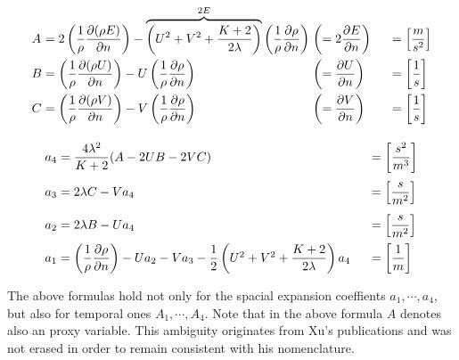 \documentclass[
	pdftex,             %
	12pt,				%
	a4paper,		   	%
	english,				%
	oneside,			%
]{article}
\begin{document}
\begin{equation}
\arraycolsep=1.4pt\def\arraystretch{2.2}
\begin{array}{lclll}
A &=& 2 \left( \dfrac{1}{\rho}\dfrac{\partial (\rho E)}{\partial n} \right)
  - \overbrace{ \left( U^2 + V^2 + \dfrac{K+2}{2\lambda} \right) }^{2E}
  \left( \dfrac{1}{\rho}\dfrac{\partial\rho}{\partial n} \right)
    &\left( = 2 \dfrac{\partial E}{\partial n} \right)
    & \hspace{0.5cm} = \left[\dfrac{m}{s^2} \right]
\\
B &=& \left( \dfrac{1}{\rho}\dfrac{\partial (\rho U)}{\partial n} \right)
   - U\left(\dfrac{1}{\rho}\dfrac{\partial \rho}{\partial n} \right)
	&\left( = \dfrac{\partial U}{\partial n} \right)
    & \hspace{0.5cm} = \left[\dfrac{1}{s} \right]
\\
C &=& \left( \dfrac{1}{\rho}\dfrac{\partial (\rho V)}{\partial n} \right)
   - V\left( \dfrac{1}{\rho}\dfrac{\partial \rho}{\partial n} \right)
	&\left( = \dfrac{\partial V}{\partial n} \right)
    & \hspace{0.5cm} = \left[\dfrac{1}{s} \right]
\end{array}
\end{equation}

\begin{equation}
\arraycolsep=1.4pt\def\arraystretch{2.2}
\begin{array}{lcll}
a_4 &=& \dfrac{4 \lambda^2}{K+2} ( A - 2 U B - 2 V C )
    & \hspace{0.5cm} = \left[\dfrac{s^2}{m^3} \right]
\\
a_3 &=& 2 \lambda C - V a_4
    & \hspace{0.5cm} = \left[\dfrac{s}{m^2} \right]
\\
a_2 &=& 2 \lambda B - U a_4
    & \hspace{0.5cm} = \left[\dfrac{s}{m^2} \right]
\\
a_1 &=& \left( \dfrac{1}{\rho} \dfrac{\partial \rho}{\partial n} \right)
     - U a_2 - V a_3 - \dfrac{1}{2} \left( U^2 + V^2 + \dfrac{K+2}{2\lambda} \right) a_4
    & \hspace{0.5cm} = \left[\dfrac{1}{m} \right]
\end{array}
\end{equation}

The above formulas hold not only for the spacial expansion coeffients $a_1, \cdots, a_4$, but also for temporal ones $A_1, \cdots, A_4$. Note that in the above formula $A$ denotes also an proxy variable. This ambiguity originates from Xu's publications and was not erased in order to remain consistent with his nomenclature.
\end{document}

